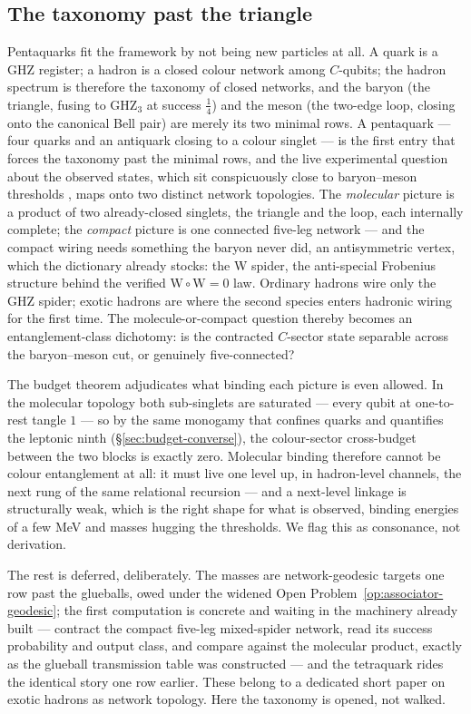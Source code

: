 \subsection{The taxonomy past the triangle}\label{sec:exotic-taxonomy}

Pentaquarks fit the framework by not being new particles at all. A quark is a GHZ register; a
hadron is a closed colour network among $C$-qubits; the hadron spectrum is therefore the taxonomy
of closed networks, and the baryon (the triangle, fusing to $\mathrm{GHZ}_3$ at success
$\tfrac14$) and the meson (the two-edge loop, closing onto the canonical Bell pair) are merely its
two minimal rows. A pentaquark --- four quarks and an antiquark closing to a colour singlet --- is
the first entry that forces the taxonomy past the minimal rows, and the live experimental question
about the observed states, which sit conspicuously close to baryon--meson thresholds
\autocite{lhcb2019pentaquark}, maps onto two distinct network topologies. The \emph{molecular}
picture is a product of two already-closed singlets, the triangle and the loop, each internally
complete; the \emph{compact} picture is one connected five-leg network --- and the compact wiring
needs something the baryon never did, an antisymmetric vertex, which the dictionary already
stocks: the W spider, the anti-special Frobenius structure behind the verified
$\mathrm{W} \circ \mathrm{W} = 0$ law. Ordinary hadrons wire only the GHZ spider; exotic hadrons
are where the second species enters hadronic wiring for the first time. The molecule-or-compact
question thereby becomes an entanglement-class dichotomy: is the contracted $C$-sector state
separable across the baryon--meson cut, or genuinely five-connected?

The budget theorem adjudicates what binding each picture is even allowed. In the molecular
topology both sub-singlets are saturated --- every qubit at one-to-rest tangle $1$ --- so by the
same monogamy that confines quarks and quantifies the leptonic ninth
(\S\ref{sec:budget-converse}), the colour-sector cross-budget between the two blocks is exactly
zero. Molecular binding therefore cannot be colour entanglement at all: it must live one level up,
in hadron-level channels, the next rung of the same relational recursion --- and a next-level
linkage is structurally weak, which is the right shape for what is observed, binding energies of a
few MeV and masses hugging the thresholds. We flag this as consonance, not derivation.

The rest is deferred, deliberately. The masses are network-geodesic targets one row past the
glueballs, owed under the widened Open Problem~\ref{op:associator-geodesic}; the first
computation is concrete and waiting in the machinery already built --- contract the compact
five-leg mixed-spider network, read its success probability and output class, and compare against
the molecular product, exactly as the glueball transmission table was constructed --- and the
tetraquark rides the identical story one row earlier. These belong to a dedicated short paper on
exotic hadrons as network topology. Here the taxonomy is opened, not walked.

